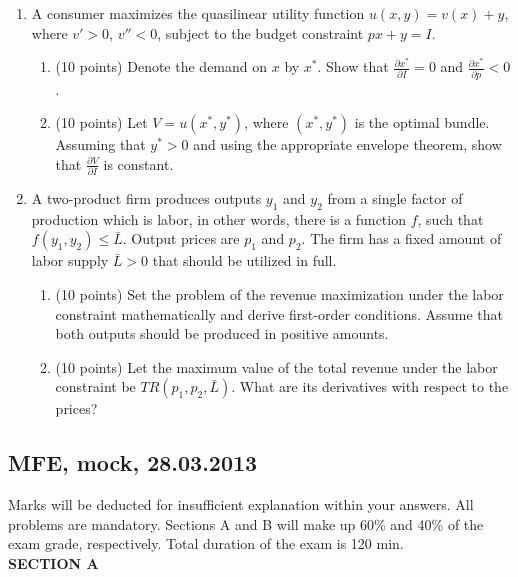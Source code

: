 \documentclass[12pt]{article} %
\theoremstyle{definition} %
\begin{document}
\begin{enumerate}[resume]
\item A consumer maximizes the quasilinear utility function $u(x,y)=v(x)+y$, where $v'>0$, $v''<0$, subject to the budget constraint $px+y=I$.
\begin{enumerate}
\item (10 points) Denote the demand on $x$ by $x^*$. Show that $\frac{\partial x^*}{\partial I}=0$ and $\frac{\partial x^*}{\partial p}<0$.
\item (10 points) Let $V=u(x^*,y^*)$, where $(x^*,y^*)$ is the optimal bundle. Assuming that $y^*>0$ and using the appropriate envelope theorem, show that $\frac{\partial V}{\partial I}$ is constant.
\end{enumerate}

\item A two-product firm produces outputs $y_1$ and $y_2$ from a single factor of production which is labor, in other words, there is a function $f$, such that $f(y_1,y_2)\leq \bar{L}$. Output prices are $p_1$ and $p_2$. The firm has a fixed amount of labor supply $\bar{L}>0$ that should be utilized in full.
\begin{enumerate}
\item (10 points) Set the problem of the revenue maximization under the labor constraint mathematically and derive first-order conditions. Assume that both outputs should be produced in positive amounts.
\item (10 points) Let the maximum value of the total revenue under the labor constraint be $TR(p_1,p_2,\bar{L})$. What are its derivatives with respect to the prices?
\end{enumerate}

\end{enumerate}

\subsection{MFE, mock, 28.03.2013}

Marks will be deducted for insufficient explanation within your answers. All problems are mandatory. Sections A and B will make up 60\% and 40\% of the exam grade, respectively. Total duration of the exam is 120 min. \\

\textbf{SECTION A}
\vspace{20pt}
\end{document}
